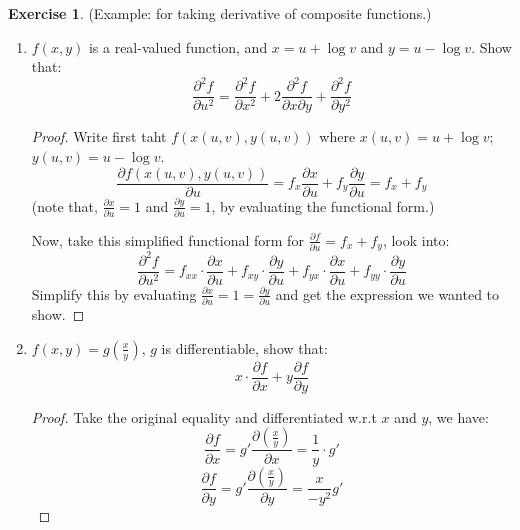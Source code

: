 \documentclass[12pt]{article}
\theoremstyle{definition}
\newtheorem{exercise}[theorem]{Exercise}
\theoremstyle{plain}
\begin{document}
\begin{exercise}
    (Example: for taking derivative of composite functions.)

    \begin{enumerate}
        \item $f(x,y)$ is a real-valued function, and $x = u + \log v$ and
            $y = u - \log v$. Show that:
            \[
                \frac{\partial^2 f}{\partial u^2 } = \frac{\partial^2
                    f}{\partial x^2} + 2 \frac{\partial^2 f}{\partial x
                \partial y} + \frac{\partial ^2 f }{ \partial y^2}
            \]
            \begin{proof}
                Write first taht $f(x(u,v), y(u,v))$ where $x(u,v) = u +
                \log v$; $y(u,v) = u  - \log v$.
                \[
                    \frac{\partial f(x(u,v), y(u,v))}{\partial u} = f_x
                    \frac{\partial x}{\partial u} + f_y
                    \frac{\partial y}{ \partial u} = f_x + f_y
                \]
                (note that, $\frac{\partial x}{\partial u}  = 1$ and
                $\frac{\partial y}{\partial u} = 1$, by evaluating the
                    functional form.)

                    Now, take this simplified functional form for
                    $\frac{\partial f }{ \partial u} = f_x + f_y$, look
                    into:
                    \[
                        \frac{\partial^2 f}{\partial u^2} = f_{xx} \cdot
                        \frac{\partial x}{ \partial u} + f_{xy} \cdot
                        \frac{\partial y}{\partial u} + f_{yx} \cdot
                        \frac{\partial x}{\partial u} +
                        f_{y y} \cdot \frac{\partial
                        y}{\partial u}
                    \]
                    Simplify this by evaluating $\frac{\partial x}{\partial
                    u} = 1 = \frac{\partial y}{\partial u}$ and get the
                    expression we wanted to show.
            \end{proof}
        \item $f(x,y) = g(\frac{x}{y})$, $g$ is differentiable, show that:
            \[
                x \cdot \frac{\partial f }{ \partial x} + y
                \frac{\partial f}{ \partial y}
            \]
            \begin{proof}
                Take the original equality and differentiated w.r.t $x$ and
                $y$, we have:
                \[
                    \frac{\partial f}{\partial x} = g' \frac{\partial
                    \left( \frac{x}{y} \right)}{\partial x} = \frac{1}{y} \cdot g'
                \]
                \[
                    \frac{\partial f}{\partial y} = g' \frac{\partial \left(
                    \frac{x}{y} \right)}{\partial y} =  \frac{x}{-y^2} g'
                \]
            \end{proof}
    \end{enumerate}
\end{exercise}
\end{document}
